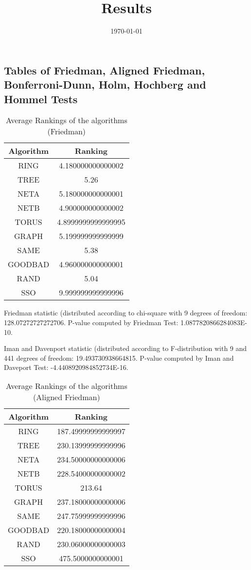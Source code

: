 \documentclass[a4paper,10pt]{article}
\title{Results}
\author{}
\date{\today}
\begin{document}
\begin{landscape}
\oddsidemargin 0in \topmargin 0in\maketitle
\section{Tables of Friedman, Aligned Friedman, Bonferroni-Dunn, Holm, Hochberg and Hommel Tests}
\begin{table}[!htp]
\centering
\caption{Average Rankings of the algorithms (Friedman)
}\begin{tabular}{c|c}
Algorithm&Ranking\\
\hline
 RING&4.180000000000002\\
 TREE&5.26\\
 NETA&5.180000000000001\\
 NETB&4.900000000000002\\
 TORUS&4.8999999999999995\\
 GRAPH&5.199999999999999\\
 SAME&5.38\\
 GOODBAD&4.960000000000001\\
 RAND&5.04\\
 SSO&9.999999999999996\\
\end{tabular}
\end{table}


Friedman statistic (distributed according to chi-square with 9 degrees of freedom: 128.07272727272706. 
P-value computed by Friedman Test: 1.0877820866284083E-10.\newline

Iman and Davenport statistic (distributed according to F-distribution with 9 and 441 degrees of freedom: 19.493730938664815. 
P-value computed by Iman and Daveport Test: -4.4408920984852734E-16.\newline


\newpage

\begin{table}[!htp]
\centering
\caption{Average Rankings of the algorithms (Aligned Friedman)
}\begin{tabular}{c|c}
Algorithm&Ranking\\
\hline
 RING&187.49999999999997\\
 TREE&230.13999999999996\\
 NETA&234.50000000000006\\
 NETB&228.54000000000002\\
 TORUS&213.64\\
 GRAPH&237.18000000000006\\
 SAME&247.75999999999996\\
 GOODBAD&220.18000000000004\\
 RAND&230.06000000000003\\
 SSO&475.5000000000001\\
\end{tabular}
\end{table}



\end{landscape}
\end{document}
